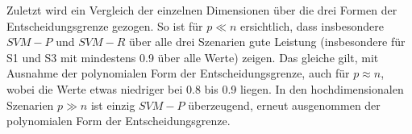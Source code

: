\documentclass[
]{article}
\begin{document}
Zuletzt wird ein Vergleich der einzelnen Dimensionen über die drei
Formen der Entscheidungsgrenze gezogen. So ist für \(p \ll n\)
ersichtlich, dass insbesondere \(SVM-P\) und \(SVM-R\) über alle drei
Szenarien gute Leistung (insbesondere für S1 und S3 mit mindestens 0.9
über alle Werte) zeigen. Das gleiche gilt, mit Ausnahme der polynomialen
Form der Entscheidungsgrenze, auch für \(p \approx n\), wobei die Werte
etwas niedriger bei 0.8 bis 0.9 liegen. In den hochdimensionalen
Szenarien \(p \gg n\) ist einzig \(SVM-P\) überzeugend, erneut
ausgenommen der polynomialen Form der Entscheidungsgrenze.

\printbibliography
\end{document}
